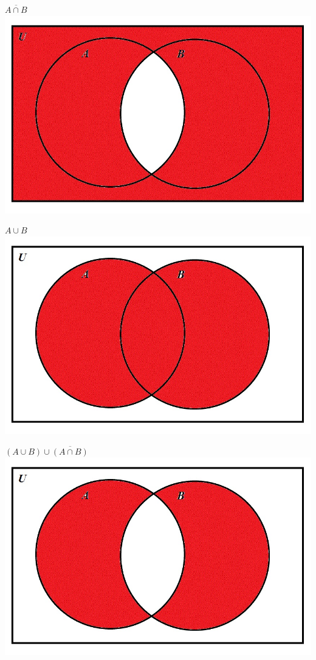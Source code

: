 \documentclass[10pt]{article}
\begin{document}
$\overline{A \cap B}$\\
\includegraphics[scale=0.3]{2}

$A \cup B$\\
\includegraphics[scale=0.3]{3}

$(A \cup B) \cup \overline{(A \cap B)}$\\
\includegraphics[scale=0.3]{4}
\end{document}
